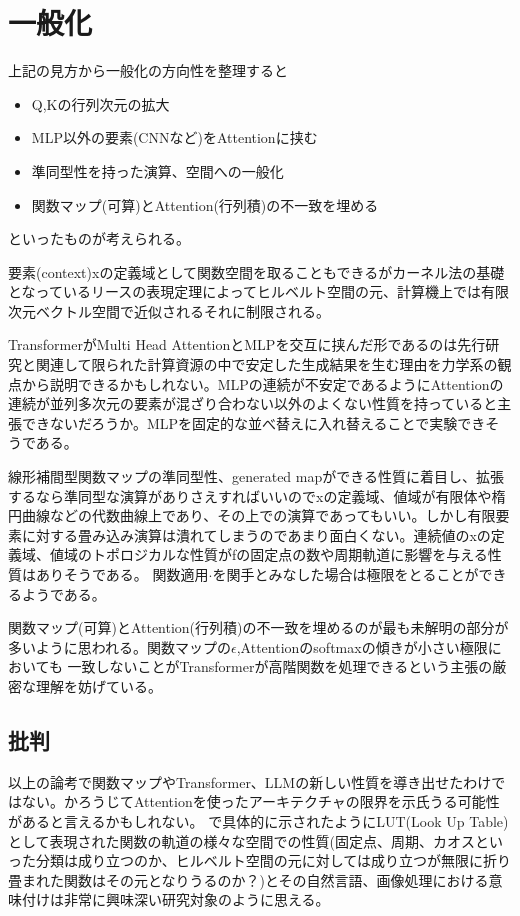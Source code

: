 \documentclass[a4paper,11pt]{article}
\begin{document}
\section{一般化}
上記の見方から一般化の方向性を整理すると
\begin{itemize}
  \item Q,Kの行列次元の拡大
  \item MLP以外の要素(CNNなど)をAttentionに挟む
  \item 準同型性を持った演算、空間への一般化
  \item 関数マップ(可算)とAttention(行列積)の不一致を埋める
\end{itemize}
といったものが考えられる。

要素(context)xの定義域として関数空間を取ることもできるがカーネル法の基礎となっているリースの表現定理によってヒルベルト空間の元、計算機上では有限次元ベクトル空間で近似されるそれに制限される。

TransformerがMulti Head AttentionとMLPを交互に挟んだ形であるのは先行研究\cite{Inoue_2022}と関連して限られた計算資源の中で安定した生成結果を生む理由を力学系の観点から説明できるかもしれない。MLPの連続が不安定であるようにAttentionの連続が並列多次元の要素が混ざり合わない以外のよくない性質を持っていると主張できないだろうか。MLPを固定的な並べ替えに入れ替えることで実験できそうである。

線形補間型関数マップの準同型性、generated mapができる性質に着目し、拡張するなら準同型な演算がありさえすればいいのでxの定義域、値域が有限体や楕円曲線などの代数曲線上であり、その上での演算であってもいい。しかし有限要素に対する畳み込み演算は潰れてしまうのであまり面白くない。連続値のxの定義域、値域のトポロジカルな性質がfの固定点の数や周期軌道に影響を与える性質はありそうである。
関数適用$\cdot$を関手とみなした場合は極限をとることができるようである。

関数マップ(可算)とAttention(行列積)の不一致を埋めるのが最も未解明の部分が多いように思われる。関数マップの$\epsilon$,Attentionのsoftmaxの傾きが小さい極限においても
一致しないことがTransformerが高階関数を処理できるという主張の厳密な理解を妨げている。

\subsection{批判}
以上の論考で関数マップやTransformer、LLMの新しい性質を導き出せたわけではない。かろうじてAttentionを使ったアーキテクチャの限界を示氏うる可能性があると言えるかもしれない。
\cite{Inoue_2022}で具体的に示されたようにLUT(Look Up Table)として表現された関数の軌道の様々な空間での性質(固定点、周期、カオスといった分類は成り立つのか、ヒルベルト空間の元に対しては成り立つが無限に折り畳まれた関数はその元となりうるのか？)とその自然言語、画像処理における意味付けは非常に興味深い研究対象のように思える。



\end{document}
